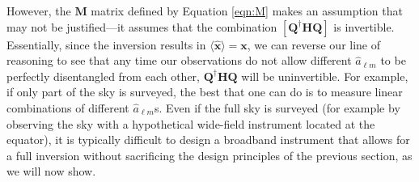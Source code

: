 \documentclass[twolcolumn,apj,iop,numberedappendix]{emulateapj}
\newcommand{\Hmat}{\mathbf{H}}
\newcommand{\Q}{\mathbf{Q}}
\newcommand{\M}{\mathbf{M}}
\newcommand{\acl}[1]{{\color{red} \textbf{[ACL:  #1]}}}
\newcommand{\mep}[1]{{\color{applegreen} \textbf{[MEP:  #1]}}}
\begin{document}
However, the $\M$ matrix defined by Equation \eqref{eqn:M} makes an assumption that may not be justified---it assumes that the combination $[\Q^\dagger \Hmat \Q]$ is invertible. Essentially, since the inversion results in $\langle \mathbf{\hat x} \rangle = \mathbf{x}$, we can reverse our line of reasoning to see that any time our observations do not allow different $\hat{a}_{\ell m}$ to be perfectly disentangled from each other, $\Q^\dagger \Hmat \Q$ will be uninvertible. For example, if only part of the sky is surveyed, the best that one can do is to measure linear combinations of different $\hat{a}_{\ell m}$s. Even if the full sky is surveyed (for example by observing the sky with a hypothetical wide-field instrument located at the equator), it is typically difficult to design a broadband instrument that allows for a full inversion without sacrificing the design principles of the previous section, as we will now show.

%
%
\end{document}
